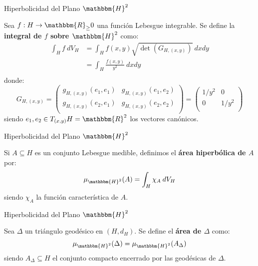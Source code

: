 \documentclass[xcolor=dvipsnames]{beamer}
\theoremstyle{largebreak}
\newcommand\cf[3]{\ensuremath{#1:#2\rightarrow#3}}
\newcommand{\bbm}[1]{\ensuremath{\mathbbm{#1}}}
\begin{document}
\begin{frame}{Hiperbolicidad del Plano $\bbm{H}^2$}
    \begin{mydef}
        Sea $\cf{f}{H}{\bbm{R}_\geq0}$ una función Lebesgue integrable. Se define la \textbf{integral de $f$ sobre $\bbm{H}^2$} como:
        \begin{equation*}
            \begin{split}
                \int_{H}f\:dV_H&=\int_{H}f(x,y)\sqrt{\det(G_{H,(x,y)})}\:dxdy\\
                &=\int_{H}\frac{f(x,y)}{y^2}\:dxdy\\
            \end{split}
        \end{equation*}
        donde:
        \begin{equation*}
            G_{ H,(x,y)}=\left(\begin{array}{cc}
                g_{ H,(x,y)}(e_1,e_1) & g_{ H,(x,y)}(e_1,e_2) \\
                g_{ H,(x,y)}(e_2,e_1) & g_{ H,(x,y)}(e_2,e_2) \\
            \end{array} \right)=\left(\begin{array}{cc}
                1/y^2 & 0 \\
                0 & 1/y^2 \\
            \end{array} \right)
        \end{equation*}
        siendo $e_1,e_2\in T_{(x,y)}H=\bbm{R}^2$ los vectores canónicos.
    \end{mydef}
\end{frame}

\begin{frame}{Hiperbolicidad del Plano $\bbm{H}^2$}
    \begin{mydef}
        Si $A\subseteq H$ es un conjunto Lebesgue medible, definimos el \textbf{área hiperbólica de $A$} por:
        \begin{equation*}
            \mu_{\bbm{H}^2}(A)=\int_{H}\chi_A\:dV_H
        \end{equation*}
        siendo $\chi_A$ la función característica de $A$.
    \end{mydef}
\end{frame}

\begin{frame}{Hiperbolicidad del Plano $\bbm{H}^2$}
    \begin{mydef}
        Sea $\Delta$ un triángulo geodésico en $(H,d_H)$. Se define el \textbf{área de $\Delta$} como:
        \begin{equation*}
            \mu_{\bbm{H}^2}(\Delta)=\mu_{\bbm{H}^2}(A_\Delta)
        \end{equation*}
        siendo $A_\Delta\subseteq H$ el conjunto compacto encerrado por las geodésicas de $\Delta$.
    \end{mydef}
\end{frame}
\end{document}

